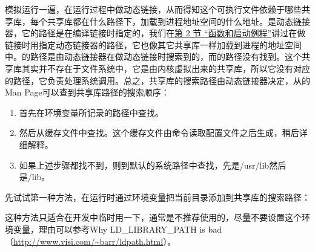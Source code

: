 模拟运行一遍，在运行过程中做动态链接，从而得知这个可执行文件依赖于哪些共享库，每个共享库都在什么路径下，加载到进程地址空间的什么地址。是动态链接器，它的路径是在编译链接时指定的，我们在\hyperlink{db.ch19s02.id2776173}{第 2 节 “函数和启动例程”}讲过在做链接时用指定动态链接器的路径，它也像其它共享库一样加载到进程的地址空间中。的路径是由动态链接器在做动态链接时搜索到的，而的路径没有找到。这个共享库其实并不存在于文件系统中，它是由内核虚拟出来的共享库，所以它没有对应的路径，它负责处理系统调用。总之，共享库的搜索路径由动态链接器决定，从的Man Page可以查到共享库路径的搜索顺序：


\begin{enumerate}

\item 首先在环境变量所记录的路径中查找。

\item 然后从缓存文件中查找。这个缓存文件由命令读取配置文件之后生成，稍后详细解释。

\item 如果上述步骤都找不到，则到默认的系统路径中查找，先是/usr/\BookSplit{}lib然后是/lib。
\end{enumerate}


先试试第一种方法，在运行时通过环境变量把当前目录添加到共享库的搜索路径：




这种方法只适合在开发中临时用一下，通常是不推荐使用的，尽量不要设置这个环境变量，理由可以参考Why LD\_\BookSplit{}LIBRARY\_\BookSplit{}PATH is bad（\url{http://www.visi.com/~barr/ldpath.html}）。



